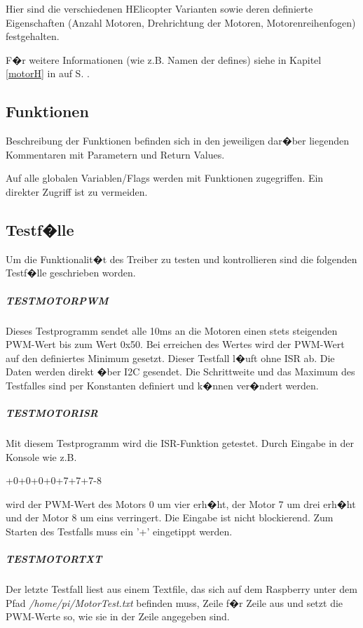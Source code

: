 Hier sind die verschiedenen HElicopter Varianten sowie deren definierte Eigenschaften (Anzahl Motoren, Drehrichtung der Motoren, Motorenreihenfogen) festgehalten.

F�r weitere Informationen (wie z.B. Namen der defines) siehe in Kapitel \ref{motorH} in   auf S.\pageref{motorH} .

\subsection{Funktionen}

Beschreibung der Funktionen befinden sich in den jeweiligen dar�ber liegenden Kommentaren mit Parametern und Return Values.

Auf alle globalen Variablen/Flags werden mit Funktionen zugegriffen. Ein direkter Zugriff ist zu vermeiden.


\subsection{Testf�lle}

Um die Funktionalit�t des Treiber zu testen und kontrollieren sind die folgenden Testf�lle geschrieben worden. 

\subparagraph{TESTMOTORPWM}

Dieses Testprogramm sendet alle 10ms an die Motoren einen stets steigenden PWM-Wert bis zum Wert 0x50. Bei erreichen des Wertes wird der PWM-Wert auf den definiertes Minimum gesetzt. Dieser Testfall l�uft ohne ISR ab. Die Daten werden direkt �ber I2C gesendet. Die Schrittweite und das Maximum des Testfalles sind per Konstanten definiert und k�nnen ver�ndert werden. 

\subparagraph{TESTMOTORISR}

Mit diesem Testprogramm wird die ISR-Funktion getestet. Durch Eingabe in der Konsole wie z.B.

+0+0+0+0+7+7+7-8

wird der  PWM-Wert des Motors 0 um vier erh�ht, der Motor 7 um drei erh�ht und der Motor 8 um eins verringert. Die Eingabe ist nicht blockierend. Zum Starten des Testfalls muss ein '+' eingetippt werden.

\subparagraph{TESTMOTORTXT}

Der letzte Testfall liest aus einem Textfile, das sich auf dem Raspberry unter dem Pfad \emph{/home/pi/MotorTest.txt} befinden muss, Zeile f�r Zeile aus und setzt die PWM-Werte so, wie sie in der Zeile angegeben sind.

